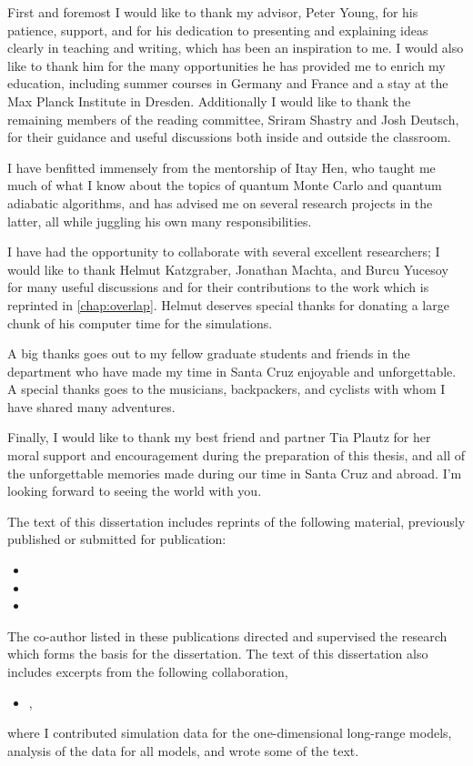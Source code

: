\begin{acknowledgements}
  \DoubleSpacing
  First and foremost I would like to thank my advisor, Peter Young, for his
  patience, support, and for his dedication to presenting and explaining ideas
  clearly in teaching and writing, which has been an inspiration to me. I would
  also like to thank him for the many opportunities he has provided me to
  enrich my education, including summer courses in Germany and France and a
  stay at the Max Planck Institute in Dresden. Additionally I would like to
  thank the remaining members of the reading committee, Sriram Shastry and Josh
  Deutsch, for their guidance and useful discussions both inside and outside
  the classroom.

  I have benfitted immensely from the mentorship of Itay Hen, who taught me
  much of what I know about the topics of quantum Monte Carlo and quantum
  adiabatic algorithms, and has advised me on several research projects in the
  latter, all while juggling his own many responsibilities.

  I have had the opportunity to collaborate with several excellent researchers;
  I would like to thank Helmut Katzgraber, Jonathan Machta, and Burcu Yucesoy
  for many useful discussions and for their contributions to the work which is
  reprinted in \cref{chap:overlap}. Helmut deserves special thanks for donating
  a large chunk of his computer time for the simulations.

  A big thanks goes out to my fellow graduate students and friends in the
  department who have made my time in Santa Cruz enjoyable and unforgettable. A
  special thanks goes to the musicians, backpackers, and cyclists with whom I
  have shared many adventures.

  Finally, I would like to thank my best friend and partner Tia Plautz for her
  moral support and encouragement during the preparation of this thesis, and
  all of the unforgettable memories made during our time in Santa Cruz and
  abroad. I'm looking forward to seeing the world with you.

  The text of this dissertation includes reprints of the following material,
  previously published or submitted for publication:
  \begin{itemize}
    \item{}
    \item{}
    \item{}
  \end{itemize}
  The co-author listed in these publications directed and supervised the
  research which forms the basis for the dissertation. The text of this
  dissertation also includes excerpts from the following collaboration,
  \begin{itemize}
    \item{},
  \end{itemize}
  where I contributed simulation data for the one-dimensional long-range
  models, analysis of the data for all models, and wrote some of the text.
\end{acknowledgements}
